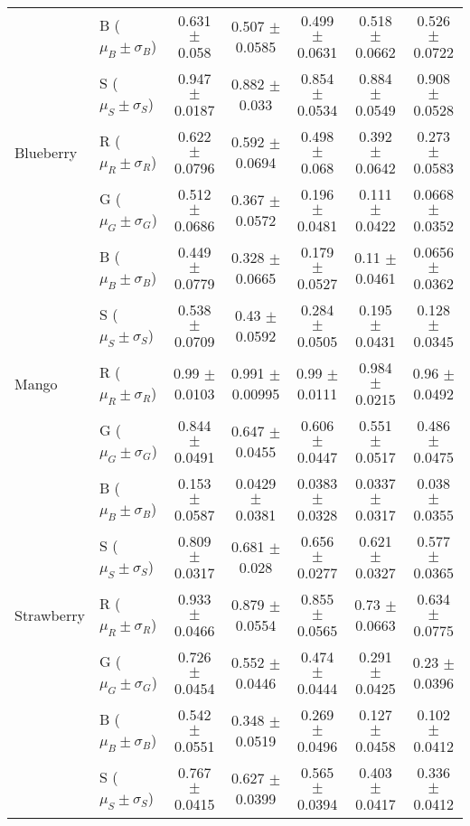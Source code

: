 \documentclass[authoryear]{elsarticle}
\begin{document}
\begin{tabular}{llccccc}
          		 & B ($\mu_B \pm \sigma_B$) & 0.631 $\pm$ 0.058 & 0.507 $\pm$ 0.0585 & 0.499 $\pm$ 0.0631 & 0.518 $\pm$ 0.0662 & 0.526 $\pm$ 0.0722 \\
          		 & S ($\mu_S \pm \sigma_S$) & 0.947 $\pm$ 0.0187 & 0.882 $\pm$ 0.033 & 0.854 $\pm$ 0.0534 & 0.884 $\pm$ 0.0549 & 0.908 $\pm$ 0.0528 \\
    \midrule
	Blueberry	 & R ($\mu_R \pm \sigma_R$) & 0.622 $\pm$ 0.0796 & 0.592 $\pm$ 0.0694 & 0.498 $\pm$ 0.068 & 0.392 $\pm$ 0.0642 & 0.273 $\pm$ 0.0583 \\
         		 & G ($\mu_G \pm \sigma_G$) & 0.512 $\pm$ 0.0686 & 0.367 $\pm$ 0.0572 & 0.196 $\pm$ 0.0481 & 0.111 $\pm$ 0.0422 & 0.0668 $\pm$ 0.0352 \\
          		 & B ($\mu_B \pm \sigma_B$) & 0.449 $\pm$ 0.0779 & 0.328 $\pm$ 0.0665 & 0.179 $\pm$ 0.0527 & 0.11 $\pm$ 0.0461 & 0.0656 $\pm$ 0.0362 \\
 				 & S ($\mu_S \pm \sigma_S$) & 0.538 $\pm$ 0.0709 & 0.43 $\pm$ 0.0592 & 0.284 $\pm$ 0.0505 & 0.195 $\pm$ 0.0431 & 0.128 $\pm$ 0.0345 \\
	\midrule	
	Mango		 & R ($\mu_R \pm \sigma_R$) & 0.99 $\pm$ 0.0103 & 0.991 $\pm$ 0.00995 & 0.99 $\pm$ 0.0111 & 0.984 $\pm$ 0.0215 & 0.96 $\pm$ 0.0492 \\
         		 & G ($\mu_G \pm \sigma_G$) & 0.844 $\pm$ 0.0491 & 0.647 $\pm$ 0.0455 & 0.606 $\pm$ 0.0447 & 0.551 $\pm$ 0.0517 & 0.486 $\pm$ 0.0475 \\
          		 & B ($\mu_B \pm \sigma_B$) & 0.153 $\pm$ 0.0587 & 0.0429 $\pm$ 0.0381 & 0.0383 $\pm$ 0.0328 & 0.0337 $\pm$ 0.0317 & 0.038 $\pm$ 0.0355 \\
          		 & S ($\mu_S \pm \sigma_S$) & 0.809 $\pm$ 0.0317 & 0.681 $\pm$ 0.028 & 0.656 $\pm$ 0.0277 & 0.621 $\pm$ 0.0327 & 0.577 $\pm$ 0.0365 \\
    \midrule
	Strawberry	 & R ($\mu_R \pm \sigma_R$) & 0.933 $\pm$ 0.0466 & 0.879 $\pm$ 0.0554 & 0.855 $\pm$ 0.0565 & 0.73 $\pm$ 0.0663 & 0.634 $\pm$ 0.0775 \\
         		 & G ($\mu_G \pm \sigma_G$) & 0.726 $\pm$ 0.0454 & 0.552 $\pm$ 0.0446 & 0.474 $\pm$ 0.0444 & 0.291 $\pm$ 0.0425 & 0.23 $\pm$ 0.0396 \\
          		 & B ($\mu_B \pm \sigma_B$) & 0.542 $\pm$ 0.0551 & 0.348 $\pm$ 0.0519 & 0.269 $\pm$ 0.0496 & 0.127 $\pm$ 0.0458 & 0.102 $\pm$ 0.0412 \\
          		 & S ($\mu_S \pm \sigma_S$) & 0.767 $\pm$ 0.0415 & 0.627 $\pm$ 0.0399 & 0.565 $\pm$ 0.0394 & 0.403 $\pm$ 0.0417 & 0.336 $\pm$ 0.0412 \\    
    \bottomrule
    \end{tabular}%
\end{document}
